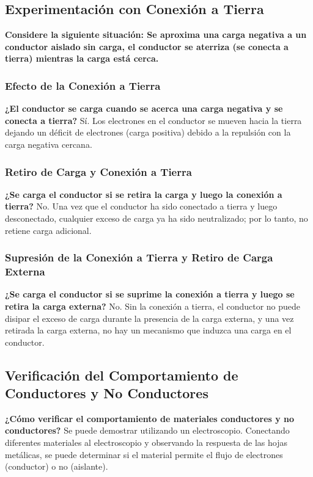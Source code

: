 \subsection{Experimentación con Conexión a Tierra}
\textbf{Considere la siguiente situación: Se aproxima una carga negativa a un conductor aislado sin
carga, el conductor se aterriza (se conecta a tierra) mientras la carga está cerca.}
\subsubsection{Efecto de la Conexión a Tierra}
\textbf{¿El conductor se carga cuando se acerca una carga negativa y se conecta a tierra?} Sí. Los electrones en el conductor se mueven hacia la tierra dejando un déficit de electrones (carga positiva) debido a la repulsión con la carga negativa cercana.

\subsubsection{Retiro de Carga y Conexión a Tierra}
\textbf{¿Se carga el conductor si se retira la carga y luego la conexión a tierra?} No. Una vez que el conductor ha sido conectado a tierra y luego desconectado, cualquier exceso de carga ya ha sido neutralizado; por lo tanto, no retiene carga adicional.

\subsubsection{Supresión de la Conexión a Tierra y Retiro de Carga Externa}
\textbf{¿Se carga el conductor si se suprime la conexión a tierra y luego se retira la carga externa?} No. Sin la conexión a tierra, el conductor no puede disipar el exceso de carga durante la presencia de la carga externa, y una vez retirada la carga externa, no hay un mecanismo que induzca una carga en el conductor.

\subsection{Verificación del Comportamiento de Conductores y No Conductores}
\textbf{¿Cómo verificar el comportamiento de materiales conductores y no conductores?} Se puede demostrar utilizando un electroscopio. Conectando diferentes materiales al electroscopio y observando la respuesta de las hojas metálicas, se puede determinar si el material permite el flujo de electrones (conductor) o no (aislante).

